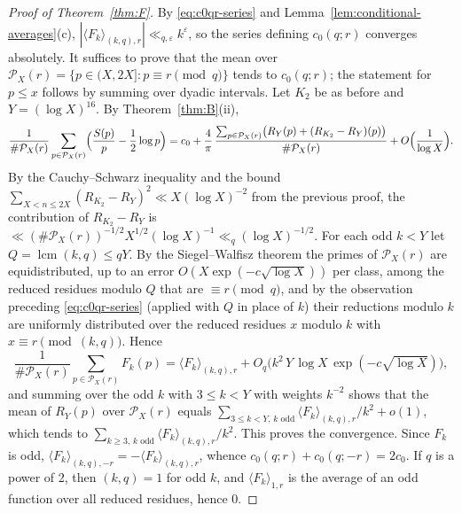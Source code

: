 \begin{proof}[Proof of Theorem~\textup{\ref{thm:F}}]
By \eqref{eq:c0qr-series} and Lemma~\ref{lem:conditional-averages}(c), $|\langle F_k\rangle_{(k,q),r}|\ll_{q,\varepsilon}k^\varepsilon$, so the series defining $c_0(q;r)$ converges absolutely. It suffices to prove that the mean over $\mathcal P_X(r)=\{p\in(X,2X]:p\equiv r\pmod q\}$ tends to $c_0(q;r)$; the statement for $p\le x$ follows by summing over dyadic intervals. Let $K_2$ be as before and $Y=(\log X)^{16}$. By Theorem~\ref{thm:B}(ii),
\[
\frac{1}{\#\mathcal P_X(r)}\sum_{p\in\mathcal P_X(r)}\Bigl(\frac{S(p)}{p}-\frac12\log p\Bigr)=c_0+\frac4\pi\,\frac{\sum_{p\in\mathcal P_X(r)}\bigl(R_Y(p)+(R_{K_2}-R_Y)(p)\bigr)}{\#\mathcal P_X(r)}+O\Bigl(\frac{1}{\log X}\Bigr).
\]
By the Cauchy--Schwarz inequality and the bound $\sum_{X<n\le 2X}(R_{K_2}-R_Y)^2\ll X(\log X)^{-2}$ from the previous proof, the contribution of $R_{K_2}-R_Y$ is $\ll(\#\mathcal P_X(r))^{-1/2}X^{1/2}(\log X)^{-1}\ll_q(\log X)^{-1/2}$. For each odd $k<Y$ let $Q=\operatorname{lcm}(k,q)\le qY$. By the Siegel--Walfisz theorem the primes of $\mathcal P_X(r)$ are equidistributed, up to an error $O(X\exp(-c\sqrt{\log X}))$ per class, among the reduced residues modulo $Q$ that are $\equiv r\pmod q$, and by the observation preceding \eqref{eq:c0qr-series} (applied with $Q$ in place of $k$) their reductions modulo $k$ are uniformly distributed over the reduced residues $x$ modulo $k$ with $x\equiv r\pmod{(k,q)}$. Hence
\[
\frac{1}{\#\mathcal P_X(r)}\sum_{p\in\mathcal P_X(r)}F_k(p)=\langle F_k\rangle_{(k,q),r}+O_q\bigl(k^2\,Y\,\log X\,\exp(-c\sqrt{\log X})\bigr),
\]
and summing over the odd $k$ with $3\le k<Y$ with weights $k^{-2}$ shows that the mean of $R_Y(p)$ over $\mathcal P_X(r)$ equals $\sum_{3\le k<Y,\,k\text{ odd}}\langle F_k\rangle_{(k,q),r}/k^2+o(1)$, which tends to $\sum_{k\ge3,\,k\text{ odd}}\langle F_k\rangle_{(k,q),r}/k^2$. This proves the convergence. Since $F_k$ is odd, $\langle F_k\rangle_{(k,q),-r}=-\langle F_k\rangle_{(k,q),r}$, whence $c_0(q;r)+c_0(q;-r)=2c_0$. If $q$ is a power of 2, then $(k,q)=1$ for odd $k$, and $\langle F_k\rangle_{1,r}$ is the average of an odd function over all reduced residues, hence 0.
\end{proof}

